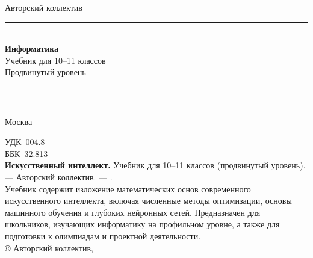 \documentclass[11pt, openany, twoside]{book}
\begin{document}
\begin{titlepage}
\centering
\vspace*{2cm}
{\sffamily\Large Авторский коллектив}\\[1.4cm]
{\color{accent}\rule{\linewidth}{1.2pt}}\\[0.4cm]
{\sffamily\Huge\bfseries Информатика}\\[0.6cm]
{\sffamily\LARGE Учебник для 10--11 классов}\\[0.3cm]
{\sffamily\large Продвинутый уровень}\\[0.4cm]
{\color{accent}\rule{\linewidth}{1.2pt}}\\[3cm]




\vfill
{\sffamily\large Москва\quad\textbullet\quad\the\year}
\end{titlepage}

\thispagestyle{empty}
\vspace*{\fill}
\noindent\small
УДК~004.8\\
ББК~32.813\\[1em]
\textbf{Искусственный интеллект.} Учебник для 10--11 классов
(продвинутый уровень). --- Авторский коллектив. --- \the\year.\\[1em]
Учебник содержит изложение математических основ современного
искусственного интеллекта, включая численные методы оптимизации,
основы машинного обучения и глубоких нейронных сетей. Предназначен
для школьников, изучающих информатику на профильном уровне, а также
для подготовки к олимпиадам и проектной деятельности.\\[1em]
\copyright{} Авторский коллектив, \the\year
\clearpage

\frontmatter
\tableofcontents


\mainmatter
\end{document}
